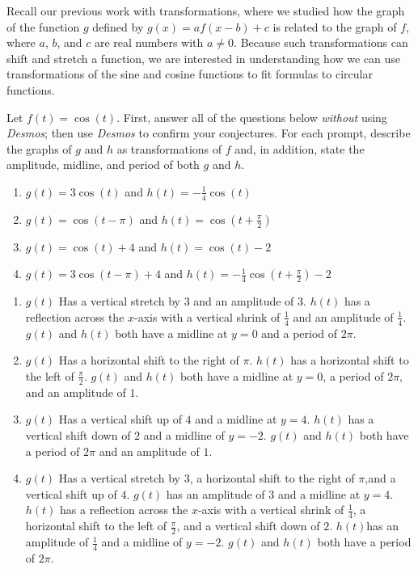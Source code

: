 \documentclass{ximera}
\begin{document}
Recall our previous work with transformations, where we studied how the graph of the function \(g\) defined by \(g(x) = af(x-b) + c\) is related to the graph of \(f\), where \(a\), \(b\), and \(c\) are real numbers with \(a \ne 0\).  Because such transformations can shift and stretch a function, we are interested in understanding how we can use transformations of the sine and cosine functions to fit formulas to circular functions.%
\begin{example}
Let \(f(t) = \cos(t)\).  First, answer all of the questions below \emph{without} using \emph{Desmos}; then use \emph{Desmos} to confirm your conjectures.  For each prompt, describe the graphs of \(g\) and \(h\) as transformations of \(f\) and, in addition, state the amplitude, midline, and period of both \(g\) and \(h\).%
\begin{enumerate}[label=\alph*.]
\item \(g(t) = 3\cos(t)\) and \(h(t) = -\frac{1}{4}\cos(t)\)%
\item \(g(t) = \cos(t-\pi)\) and \(h(t) = \cos\left(t+ \frac{\pi}{2}\right)\)%
\item \(g(t) = \cos(t)+4\) and \(h(t) = \cos\left(t\right)-2\)%
\item \(g(t) = 3\cos(t-\pi)+4\) and \(h(t) = -\frac{1}{4}\cos\left(t+ \frac{\pi}{2}\right)-2\)%
\end{enumerate}
\begin{explanation}
\begin{enumerate}[label=\alph*.]
\item $g(t)$ Has a vertical stretch by 3 and an amplitude of 3. $h(t)$ has a reflection across the $x$-axis with a vertical shrink of $\frac{1}{4}$ and an amplitude of $\frac{1}{4}$. $g(t)$ and $h(t)$ both have a midline at $y=0$ and a period of $2\pi$.
\item $g(t)$ Has a horizontal shift to the right of $\pi$. $h(t)$ has a horizontal shift to the left of $\frac{\pi}{2}$. $g(t)$ and $h(t)$ both have a midline at $y=0$, a period of $2\pi$, and an amplitude of $1$.
\item $g(t)$ Has a vertical shift up of $4$ and a midline at $y=4$. $h(t)$ has a vertical shift down of $2$ and a midline of $y=-2$. $g(t)$ and $h(t)$ both have a period of $2\pi$ and an amplitude of $1$.
\item $g(t)$ Has a vertical stretch by 3,  a horizontal shift to the right of $\pi$,and a vertical shift up of $4$. $g(t)$ has an amplitude of 3 and a midline at $y=4$. $h(t)$ has a reflection across the $x$-axis with a vertical shrink of $\frac{1}{4}$, a horizontal shift to the left of $\frac{\pi}{2}$, and a vertical shift down of $2$. $h(t)$has an amplitude of $\frac{1}{4}$ and a midline of $y=-2$. $g(t)$ and $h(t)$ both have a period of $2\pi$.
\end{enumerate}
\end{explanation}
%
\end{example}
\end{document}
